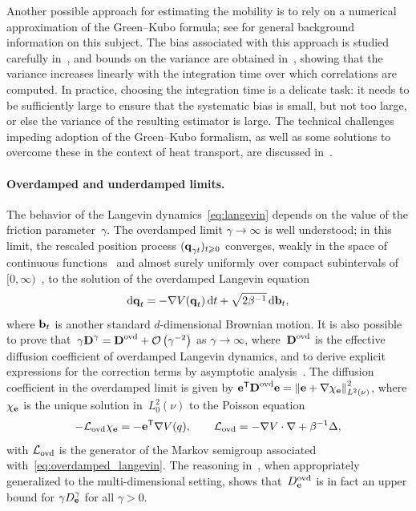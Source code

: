 \documentclass[11pt,a4paper]{article}
\begin{document}
Another possible approach for estimating the mobility is to rely on a numerical approximation of the Green--Kubo formula;
see \cite[Section 5.1.3]{MR3509213} for general background information on this subject.
The bias associated with this approach is studied carefully in~\cite{LMS16},
and bounds on the variance are obtained in~\cite{PSW21},
showing that the variance increases linearly with the integration time over which correlations are computed.
In practice, choosing the integration time is a delicate task:
it needs to be sufficiently large to ensure that the systematic bias is small,
but not too large, or else the variance of the resulting estimator is large.
The technical challenges impeding adoption of the Green--Kubo formalism,
as well as some solutions to overcome these in the context of heat transport,
are discussed in~\cite{ercole2017accurate,Baroni2020}.

\paragraph{Overdamped and underdamped limits.}
The behavior of the Langevin dynamics~\eqref{eq:langevin} depends on the value of the friction parameter~$\gamma$.
The overdamped limit $\gamma \to \infty$ is well understood;
in this limit, the rescaled position process $(\boldsymbol{\mathbf q}_{\gamma t})_{t \geqslant 0}$
converges, weakly in the space of continuous functions~\cite{MR4054345}
and almost surely uniformly over compact subintervals of $[0, \infty)$~\cite[Theorem 10.1]{MR0214150},
to the solution of the overdamped Langevin equation
\begin{equation}
    \label{eq:overdamped_langevin}
    \mathrm d \boldsymbol{\mathbf q}_t = - \nabla V(\boldsymbol{\mathbf q}_t) \, \mathrm d t + \sqrt{2 \beta^{-1}} \, \mathrm d \boldsymbol{\mathbf b}_t,
\end{equation}
where $\boldsymbol{\mathbf b}_t$ is another standard $d$-dimensional Brownian motion.
It is also possible to prove that~$\gamma \mat D^{\gamma} = \mat D^{\rm ovd} + \bigo{\gamma^{-2}}$ as $\gamma \to \infty$,
where~$\boldsymbol{\mathbf D}^{\rm ovd}$ is the effective diffusion coefficient of overdamped Langevin dynamics,
and to derive explicit expressions for the correction terms by asymptotic analysis~\cite{MR2394704}.
The diffusion coefficient in the overdamped limit is given by $\vect e^\t \mat D^{\rm ovd} \vect e = \norm{\vect e + \grad \chi_{\vect e}}[L^2(\nu)]^2$,
where $\chi_{\boldsymbol{\mathbf e}}$ is the unique solution in~$L^2_0(\nu)$ to the Poisson equation
\[
    - \mathcal L_{\rm ovd} \chi_{\boldsymbol{\mathbf e}} = - \boldsymbol{\mathbf e}^\mathsf T \nabla V(q), \qquad \mathcal L_{\rm ovd} = - \nabla V \cdot \nabla + \beta^{-1} \Delta,
\]
with $\mathcal L_{\rm ovd}$ is the generator of the Markov semigroup associated with~\eqref{eq:overdamped_langevin}.
The reasoning in~\cite[Proposition 4.1]{MR2394704},
when appropriately generalized to the multi-dimensional setting,
shows that~$D^{\rm ovd}_{\boldsymbol{\mathbf e}}$ is in fact an upper bound for $\gamma D^{\gamma}_{\boldsymbol{\mathbf e}}$ for all $\gamma > 0$.
\end{document}
